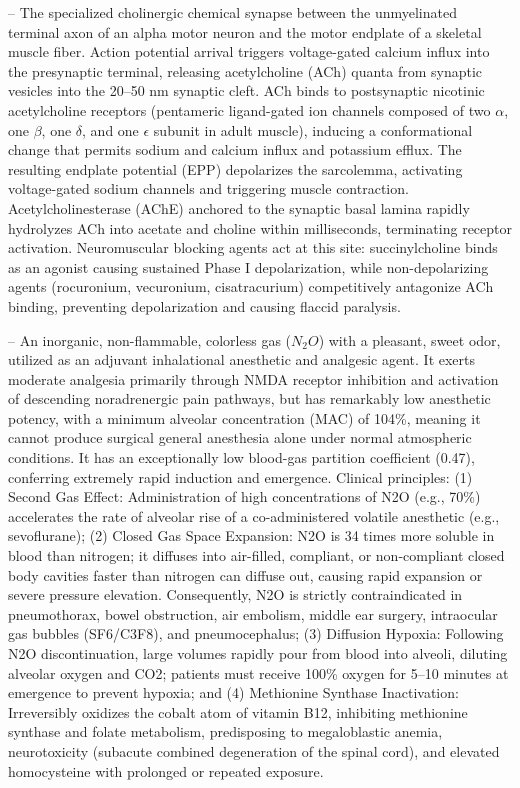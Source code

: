 -- The specialized cholinergic chemical synapse between the unmyelinated terminal axon of an alpha motor neuron and the motor endplate of a skeletal muscle fiber. Action potential arrival triggers voltage-gated calcium influx into the presynaptic terminal, releasing acetylcholine (ACh) quanta from synaptic vesicles into the 20--50 nm synaptic cleft. ACh binds to postsynaptic nicotinic acetylcholine receptors (pentameric ligand-gated ion channels composed of two $\alpha$, one $\beta$, one $\delta$, and one $\epsilon$ subunit in adult muscle), inducing a conformational change that permits sodium and calcium influx and potassium efflux. The resulting endplate potential (EPP) depolarizes the sarcolemma, activating voltage-gated sodium channels and triggering muscle contraction. Acetylcholinesterase (AChE) anchored to the synaptic basal lamina rapidly hydrolyzes ACh into acetate and choline within milliseconds, terminating receptor activation. Neuromuscular blocking agents act at this site: succinylcholine binds as an agonist causing sustained Phase I depolarization, while non-depolarizing agents (rocuronium, vecuronium, cisatracurium) competitively antagonize ACh binding, preventing depolarization and causing flaccid paralysis.

-- An inorganic, non-flammable, colorless gas ($N_2O$) with a pleasant, sweet odor, utilized as an adjuvant inhalational anesthetic and analgesic agent. It exerts moderate analgesia primarily through NMDA receptor inhibition and activation of descending noradrenergic pain pathways, but has remarkably low anesthetic potency, with a minimum alveolar concentration (MAC) of 104\%, meaning it cannot produce surgical general anesthesia alone under normal atmospheric conditions. It has an exceptionally low blood-gas partition coefficient (0.47), conferring extremely rapid induction and emergence. Clinical principles: (1) Second Gas Effect: Administration of high concentrations of N2O (e.g., 70\%) accelerates the rate of alveolar rise of a co-administered volatile anesthetic (e.g., sevoflurane); (2) Closed Gas Space Expansion: N2O is 34 times more soluble in blood than nitrogen; it diffuses into air-filled, compliant, or non-compliant closed body cavities faster than nitrogen can diffuse out, causing rapid expansion or severe pressure elevation. Consequently, N2O is strictly contraindicated in pneumothorax, bowel obstruction, air embolism, middle ear surgery, intraocular gas bubbles (SF6/C3F8), and pneumocephalus; (3) Diffusion Hypoxia: Following N2O discontinuation, large volumes rapidly pour from blood into alveoli, diluting alveolar oxygen and CO2; patients must receive 100\% oxygen for 5--10 minutes at emergence to prevent hypoxia; and (4) Methionine Synthase Inactivation: Irreversibly oxidizes the cobalt atom of vitamin B12, inhibiting methionine synthase and folate metabolism, predisposing to megaloblastic anemia, neurotoxicity (subacute combined degeneration of the spinal cord), and elevated homocysteine with prolonged or repeated exposure.

